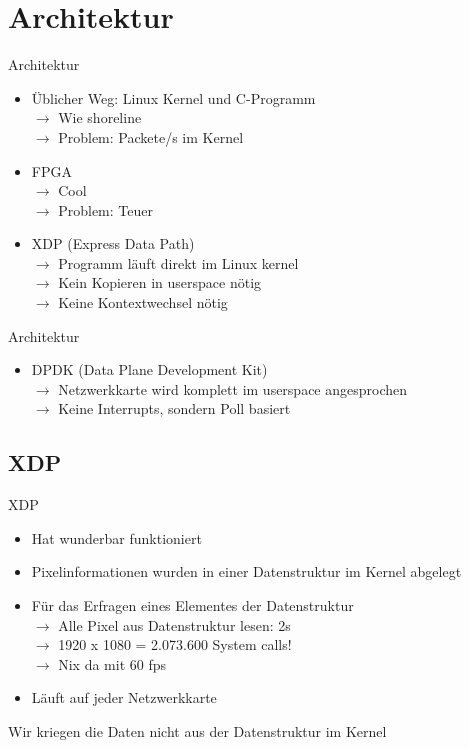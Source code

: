 \documentclass[12pt,donthandout,notes=dontshow,xcolor=table]{beamer}
\begin{document}
\section{Architektur}
\begin{frame}{Architektur}
	\begin{itemize}
		\item Üblicher Weg: Linux Kernel und C-Programm\\
		$\rightarrow$ Wie shoreline\\
		$\rightarrow$ Problem: Packete/s im Kernel
		\pause
		\item FPGA\\
		$\rightarrow$ Cool\\
		$\rightarrow$ Problem: Teuer
		\pause
		\item XDP (Express Data Path)\\
		$\rightarrow$ Programm läuft direkt im Linux kernel\\
		$\rightarrow$ Kein Kopieren in userspace nötig\\
		$\rightarrow$ Keine Kontextwechsel nötig
	\end{itemize}
\end{frame}

\begin{frame}{Architektur}
	\begin{itemize}
		\item DPDK (Data Plane Development Kit)\\
		$\rightarrow$ Netzwerkkarte wird komplett im userspace angesprochen\\
		$\rightarrow$ Keine Interrupts, sondern Poll basiert
	\end{itemize}
\end{frame}

\subsection{XDP}
\begin{frame}{XDP}
	\begin{itemize}
		\item Hat wunderbar funktioniert
		\item Pixelinformationen wurden in einer Datenstruktur im Kernel abgelegt
		\item Für das Erfragen eines Elementes der Datenstruktur\\
		$\rightarrow$ Alle Pixel aus Datenstruktur lesen: 2s\\
		\hspace{1cm} $\rightarrow$ 1920 x 1080 = 2.073.600 System calls! \\
		$\rightarrow$ Nix da mit 60 fps
		\item Läuft auf jeder Netzwerkkarte
	\end{itemize}
	\pause
	\begin{tcolorbox}[title=Problem]
		Wir kriegen die Daten nicht aus der Datenstruktur im Kernel
	\end{tcolorbox}
\end{frame}
\end{document}

